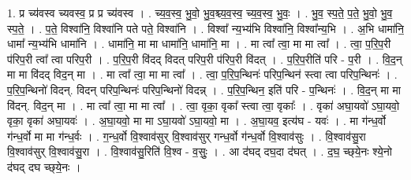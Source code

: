 \documentclass[17pt]{extarticle}
\begin{document}
1. प्र च्य॑वस्व च्यवस्व॒ प्र प्र च्य॑वस्व । . च्य॒व॒स्व॒ भु॒वो॒ भु॒व॒श्च्य॒व॒स्व॒ च्य॒व॒स्व॒ भु॒वः॒ । . भु॒व॒ स्प॒ते॒ प॒ते॒ भु॒वो॒ भु॒व॒ स्प॒ते॒ । . प॒ते॒ विश्वा॑नि॒ विश्वा॑नि पते पते॒ विश्वा॑नि । . विश्वा᳚ न्य॒भ्य॑भि विश्वा॑नि॒ विश्वा᳚न्य॒भि । . अ॒भि धामा॑नि॒ धामा᳚ न्य॒भ्य॑भि धामा॑नि । . धामा॑नि॒ मा मा धामा॑नि॒ धामा॑नि॒ मा । . मा त्वा᳚ त्वा॒ मा मा त्वा᳚ । . त्वा॒ प॒रि॒प॒री प॑रिप॒री त्वा᳚ त्वा परिप॒री । . प॒रि॒प॒री वि॑दद् विदत् परिप॒री प॑रिप॒री वि॑दत् । . प॒रि॒प॒रीति॑ परि - प॒री । . वि॒द॒न् मा मा वि॑दद् विद॒न् मा । . मा त्वा᳚ त्वा॒ मा मा त्वा᳚ । . त्वा॒ प॒रि॒प॒न्थिनः॑ परिप॒न्थिन॑ स्त्वा त्वा परिप॒न्थिनः॑ । . प॒रि॒प॒न्थिनो॑ विदन्. विदन् परिप॒न्थिनः॑ परिप॒न्थिनो॑ विदन्न् । . प॒रि॒प॒न्थिन॒ इति॑ परि - प॒न्थिनः॑ । . वि॒द॒न् मा मा वि॑दन्. विद॒न् मा । . मा त्वा᳚ त्वा॒ मा मा त्वा᳚ । . त्वा॒ वृका॒ वृका᳚ स्त्वा त्वा॒ वृकाः᳚ । . वृका॑ अघा॒यवो॑ ऽघा॒यवो॒ वृका॒ वृका॑ अघा॒यवः॑ । . अ॒घा॒यवो॒ मा मा ऽघा॒यवो॑ ऽघा॒यवो॒ मा । . अ॒घा॒यव॒ इत्य॑घ - यवः॑ । . मा ग॑न्ध॒र्वो ग॑न्ध॒र्वो मा मा ग॑न्ध॒र्वः । . ग॒न्ध॒र्वो वि॒श्वाव॑सुर् वि॒श्वाव॑सुर् गन्ध॒र्वो ग॑न्ध॒र्वो वि॒श्वाव॑सुः । . वि॒श्वाव॑सु॒रा वि॒श्वाव॑सुर् वि॒श्वाव॑सु॒रा । . वि॒श्वाव॑सु॒रिति॑ वि॒श्व - व॒सुः॒ । . आ द॑घद् दघ॒दा द॑घत् । . द॒घ॒ च्छ्‌ये॒नः श्ये॒नो द॑घद् दघ च्छ्‌ये॒नः । \newline
\end{document}
